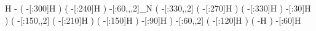               H%
             -%
                 (
           -[:300]H%
                 )
                 (
           -[:240]H%
                 )
    -[:60,,,2]_{\mcfplus}N%
                 (
        -[:330,,2]%
                     (
               -[:270]H%
                     )
                     (
               -[:330]H%
                     )
            -[:30]H%
                 )
                 (
        -[:150,,2]%
                     (
               -[:210]H%
                     )
                     (
               -[:150]H%
                     )
            -[:90]H%
                 )
     -[:60,,2]%
                 (
           -[:120]H%
                 )
                 (
                 -H%
                 )
        -[:60]H%
